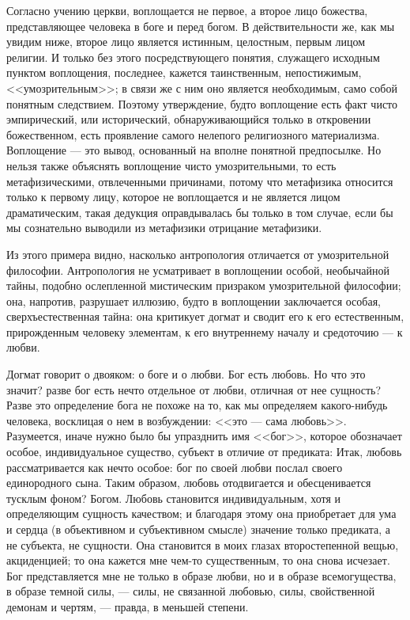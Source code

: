 \documentclass[12pt,oneside]{book}
\begin{document}
Согласно учению церкви, воплощается не первое, а второе лицо божества, представляющее человека в боге и перед богом. В действительности же, как мы увидим ниже, второе лицо является истинным, целостным, первым лицом религии. И только без этого посредствующего понятия, служащего исходным пунктом воплощения, последнее, кажется таинственным, непостижимым, <<умозрительным>>; в связи же с ним оно является необходимым, само собой понятным следствием. Поэтому утверждение, будто воплощение есть факт чисто эмпирический, или исторический, обнаруживающийся только в откровении божественном, есть проявление самого нелепого религиозного материализма. Воплощение --- это вывод, основанный на вполне понятной предпосылке. Но нельзя также объяснять воплощение чисто умозрительными, то есть метафизическими, отвлеченными причинами, потому что метафизика относится только к первому лицу, которое не воплощается и не является лицом драматическим, такая дедукция оправдывалась бы только в том случае, если бы мы сознательно выводили из метафизики отрицание метафизики.

Из этого примера видно, насколько антропология отличается от умозрительной философии. Антропология не усматривает в воплощении особой, необычайной тайны, подобно ослепленной мистическим призраком умозрительной философии; она, напротив, разрушает иллюзию, будто в воплощении заключается особая, сверхъестественная тайна: она критикует догмат и сводит его к его естественным, прирожденным человеку элементам, к его внутреннему началу и средоточию --- к любви.

Догмат говорит о двояком: о боге и о любви. Бог есть любовь. Но что это значит? разве бог есть нечто отдельное от любви, отличная от нее сущность? Разве это определение бога не похоже на то, как мы определяем какого-нибудь человека, восклицая о нем в возбуждении: <<это --- сама любовь>>. Разумеется, иначе нужно было бы упразднить имя <<бог>>, которое обозначает особое, индивидуальное существо, субъект в отличие от предиката: Итак, любовь рассматривается как нечто особое: бог по своей любви послал своего единородного сына. Таким образом, любовь отодвигается и обесценивается тусклым фоном? Богом. Любовь становится индивидуальным, хотя и определяющим сущность качеством; и благодаря этому она приобретает для ума и сердца (в объективном и субъективном смысле) значение только предиката, а не субъекта, не сущности. Она становится в моих глазах второстепенной вещью, акциденцией; то она кажется мне чем-то существенным, то она снова исчезает. Бог представляется мне не только в образе любви, но и в образе всемогущества, в образе темной силы, --- силы, не связанной любовью, силы, свойственной демонам и чертям, --- правда, в меньшей степени.
\end{document}

